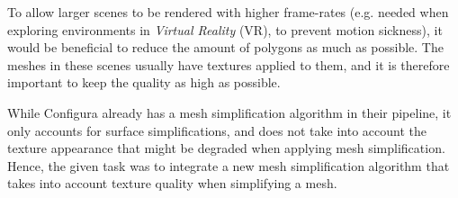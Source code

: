 To allow larger scenes to be rendered with higher frame-rates (e.g. needed when exploring environments in \emph{Virtual Reality} (VR), to prevent motion sickness), it would be beneficial to reduce the amount of polygons as much as possible. The meshes in these scenes usually have textures applied to them, and it is therefore important to keep the quality as high as possible.

While Configura already has a mesh simplification algorithm in their pipeline, it only accounts for surface simplifications, and does not take into account the texture appearance that might be degraded when applying mesh simplification. Hence, the given task was to integrate a new mesh simplification algorithm that takes into account texture quality when simplifying a mesh.


